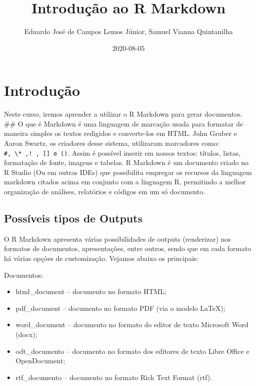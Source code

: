 \documentclass[
]{book}
\title{Introdução ao R Markdown}
\author{Eduardo José de Campos Lemos Júnior, Samuel Vianna Quintanilha}
\date{2020-08-05}
\providecommand{\tightlist}{%
  \setlength{\itemsep}{0pt}\setlength{\parskip}{0pt}}
\begin{document}
\maketitle

{
\setcounter{tocdepth}{1}
\tableofcontents
}
\hypertarget{intro}{%
\chapter{Introdução}\label{intro}}

Neste curso, iremos aprender a utilizar o R Markdown para gerar documentos.
\#\# O que é
Markdown é uma linguagem de marcação usada para formatar de maneira simples os textos redigidos e converte-los em HTML. John Gruber e Aaron Swartz, os criadores desse sistema, utilizaram marcadores como: \texttt{\#,\ \textbackslash{}*\ ,!\ ,\ {[}{]}\ e\ ()}. Assim é possível inserir em nossos textos: títulos, listas, formatação de fonte, imagens e tabelas.
R Markdown é um documento criado no R Studio (Ou em outras IDEs) que possibilita empregar os recursos da linguagem markdown citados acima em conjunto com a linguagem R, permitindo a melhor organização de análises, relatórios e códigos em um só documento.

\hypertarget{possuxedveis-tipos-de-outputs}{%
\section{Possíveis tipos de Outputs}\label{possuxedveis-tipos-de-outputs}}

O R Markdown apresenta várias possibilidades de outputs (renderizar) nos formatos de documentos, apresentações, entre outros, sendo que em cada formato há várias opções de customização. Vejamos abaixo os principais:

Documentos:

\begin{itemize}
\tightlist
\item
  html\_document -- documento no formato HTML;
\item
  pdf\_document -- documento no formato PDF (via o modelo LaTeX);
\item
  word\_document -- documento no formato do editor de texto Microsoft Word (docx);
\item
  odt\_documento -- documento no formato dos editores de texto Libre Office e OpenDocument;
\item
  rtf\_documento -- documento no formato Rich Text Format (rtf).
\end{itemize}
\end{document}
